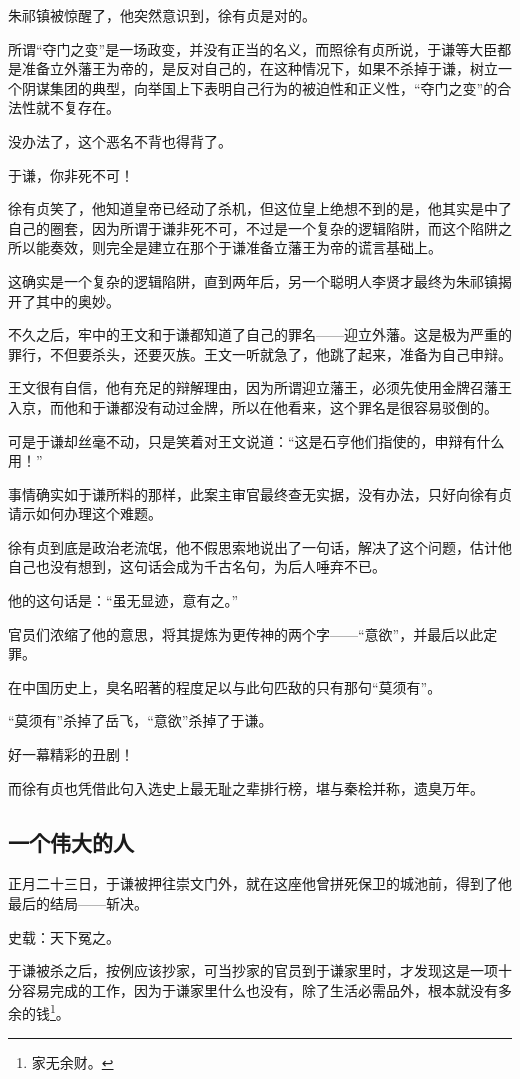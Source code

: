 \begin{multicols}{\theparacolNo}
朱祁镇被惊醒了，他突然意识到，徐有贞是对的。

所谓“夺门之变”是一场政变，并没有正当的名义，而照徐有贞所说，于谦等大臣都是准备立外藩王为帝的，是反对自己的，在这种情况下，如果不杀掉于谦，树立一个阴谋集团的典型，向举国上下表明自己行为的被迫性和正义性，“夺门之变”的合法性就不复存在。

没办法了，这个恶名不背也得背了。

于谦，你非死不可！

徐有贞笑了，他知道皇帝已经动了杀机，但这位皇上绝想不到的是，他其实是中了自己的圈套，因为所谓于谦非死不可，不过是一个复杂的逻辑陷阱，而这个陷阱之所以能奏效，则完全是建立在那个于谦准备立藩王为帝的谎言基础上。

这确实是一个复杂的逻辑陷阱，直到两年后，另一个聪明人李贤才最终为朱祁镇揭开了其中的奥妙。

不久之后，牢中的王文和于谦都知道了自己的罪名——迎立外藩。这是极为严重的罪行，不但要杀头，还要灭族。王文一听就急了，他跳了起来，准备为自己申辩。

王文很有自信，他有充足的辩解理由，因为所谓迎立藩王，必须先使用金牌召藩王入京，而他和于谦都没有动过金牌，所以在他看来，这个罪名是很容易驳倒的。

可是于谦却丝毫不动，只是笑着对王文说道：“这是石亨他们指使的，申辩有什么用！”

事情确实如于谦所料的那样，此案主审官最终查无实据，没有办法，只好向徐有贞请示如何办理这个难题。

徐有贞到底是政治老流氓，他不假思索地说出了一句话，解决了这个问题，估计他自己也没有想到，这句话会成为千古名句，为后人唾弃不已。

他的这句话是：“虽无显迹，意有之。”

官员们浓缩了他的意思，将其提炼为更传神的两个字——“意欲”，并最后以此定罪。

在中国历史上，臭名昭著的程度足以与此句匹敌的只有那句“莫须有”。

“莫须有”杀掉了岳飞，“意欲”杀掉了于谦。

好一幕精彩的丑剧！

而徐有贞也凭借此句入选史上最无耻之辈排行榜，堪与秦桧并称，遗臭万年。

\subsection{一个伟大的人}
正月二十三日，于谦被押往崇文门外，就在这座他曾拼死保卫的城池前，得到了他最后的结局——斩决。

史载：天下冤之。

于谦被杀之后，按例应该抄家，可当抄家的官员到于谦家里时，才发现这是一项十分容易完成的工作，因为于谦家里什么也没有，除了生活必需品外，根本就没有多余的钱\footnote{家无余财。}。


\end{multicols}
